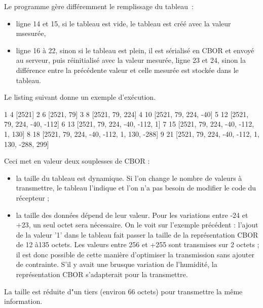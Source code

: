 
Le programme  gère différemment le remplissage du tableau~:

\begin{itemize}
    \item ligne 14 et 15, si le tableau est vide, le tableau est créé avec la valeur msesurée,
    \item ligne 16 à 22, sinon si le tableau est plein, il est sérialisé en CBOR et envoyé au serveur, puis réinitialisé avec la valeur mesurée,
    \iten ligne 23 et 24, sinon la différence entre la précédente valeur et celle mesurée est stockée dans le tableau.
\end{itemize}

       \vspace{1em}

Le listing suivant donne un exemple d'exécution.

\begin{termc}[backgroundcolor=\color{palerod}, language=json, basicstyle=\ttfamily\small, escapechar=#]
1 4 [2521]
2 6 [2521, 79]
3 8 [2521, 79, 224]
4 10 [2521, 79, 224, -40]
5 12 [2521, 79, 224, -40, -112]
6 13 [2521, 79, 224, -40, -112, 1]
7 15 [2521, 79, 224, -40, -112, 1, 130]
8 18 [2521, 79, 224, -40, -112, 1, 130, -288]
9 21 [2521, 79, 224, -40, -112, 1, 130, -288, 299]
\end{termc}

Ceci met en valeur deux souplesses de CBOR :
\begin{itemize}
    \item la taille du tableau est dynamique. Si l’on change le nombre de valeurs à transmettre, le tableau l’indique et l’on n’a pas besoin de modifier le code du récepteur ;
    \item la taille des données dépend de leur valeur. Pour les variations entre -24 et +23, un seul octet sera nécessaire. On le voit sur l’exemple précédent : l’ajout de la valeur '1' dans le tableau fait passer la taille de la représentation CBOR de 12 à135 octets. Les valeurs entre 256 et +255 sont transmises sur 2 octets ; il est donc possible de cette manière d’optimiser la transmission sans ajouter de contrainte. S’il y avait une brusque variation de l’humidité, la représentation CBOR s’adapterait pour la transmettre.
\end{itemize}

La taille est réduite d"un tiers (environ 66 octets) pour transmettre la même information.

